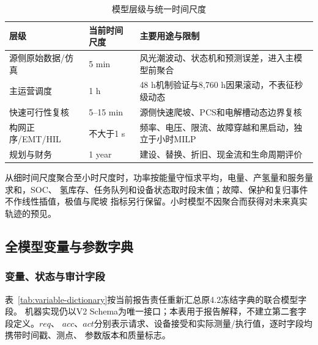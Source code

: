 \begin{table}[H]
\centering
\caption{模型层级与统一时间尺度}
\label{tab:time-scales}
\begin{tabularx}{\textwidth}{p{3.3cm} p{2.6cm} X}
\toprule
层级 & 当前时间尺度 & 主要用途与限制 \\
\midrule
源侧原始数据/仿真 & 5 min & 风光潮波动、状态机和预测误差，进入主模型前聚合 \\
主运营调度 & 1 h & 48 h机制验证与8,760 h因果滚动，不表征秒级动态 \\
快速可行性复核 & 5--15 min & 源侧快速爬坡、PCS和电解槽动态边界复核 \\
构网正序/EMT/HIL & 不大于1 s & 频率、电压、限流、故障穿越和黑启动，独立于小时MILP \\
规划与财务 & 1 year & 建设、替换、折旧、现金流和生命周期评价 \\
\bottomrule
\end{tabularx}
\end{table}

从细时间尺度聚合至小时尺度时，功率按能量守恒求平均，电量、产氢量和服务量求和，SOC、
氢库存、任务队列和设备状态取时段末值；故障、保护和复归事件不作线性插值，极值与爬坡
指标另行保留。小时模型不因聚合而获得对未来真实轨迹的预见。

\subsection{全模型变量与参数字典}

\subsubsection{变量、状态与审计字段}

表~\ref{tab:variable-dictionary}按当前报告责任重新汇总原4.2冻结字典的联合模型字段。
机器实现仍以V2 Schema为唯一接口；本表用于报告解释，不建立第二套字段定义。$req$、
$acc$、$act$分别表示请求、设备接受和实际测量/执行值，逐时字段均携带时间戳、测点、
参数版本和质量标志。

